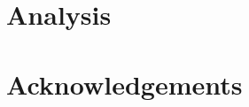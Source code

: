 \documentclass[11pt]{article}
\begin{document}

\section{Analysis}

\section*{Acknowledgements}



\end{document}
